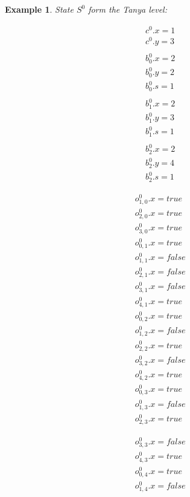 \documentclass{report}
\theoremstyle{plain}
\newtheorem{example}{Example}[section]
\begin{document}
\newpage
\begin{example} 
\label{ex:s0}
State $S^0$ form the Tanya level:

\begin{minipage}[t]{0.15\textwidth}
\begin{align*}
& c^0.x=1 \\
& c^0.y=3 \\
\\
& b_0^0.x=2 \\
& b_0^0.y=2 \\
& b_0^0.s=1 \\
\\
& b_1^0.x=2 \\
& b_1^0.y=3 \\
& b_1^0.s=1 \\
\\
& b_2^0.x=2 \\
& b_2^0.y=4 \\
& b_2^0.s=1
\end{align*}
\end{minipage}
\begin{minipage}[t]{0.15\textwidth}
\begin{align*}
& o_{1,0}^0.x=true \\
& o_{2,0}^0.x=true \\
& o_{3,0}^0.x=true \\
& o_{0,1}^0.x=true \\
& o_{1,1}^0.x=false \\
& o_{2,1}^0.x=false \\
& o_{3,1}^0.x=false \\
& o_{4,1}^0.x=true \\
& o_{0,2}^0.x=true \\
& o_{1,2}^0.x=false \\
& o_{2,2}^0.x=true \\
& o_{3,2}^0.x=false \\
& o_{4,2}^0.x=true \\
& o_{0,3}^0.x=true \\
& o_{1,3}^0.x=false \\
& o_{2,3}^0.x=true
\end{align*}
\end{minipage}
\begin{minipage}[t]{0.15\textwidth}
\begin{align*}
& o_{3,3}^0.x=false \\
& o_{4,3}^0.x=true \\
& o_{0,4}^0.x=true \\
& o_{1,4}^0.x=false \\

\end{align*}
\end{minipage}
\end{example}
\end{document}
